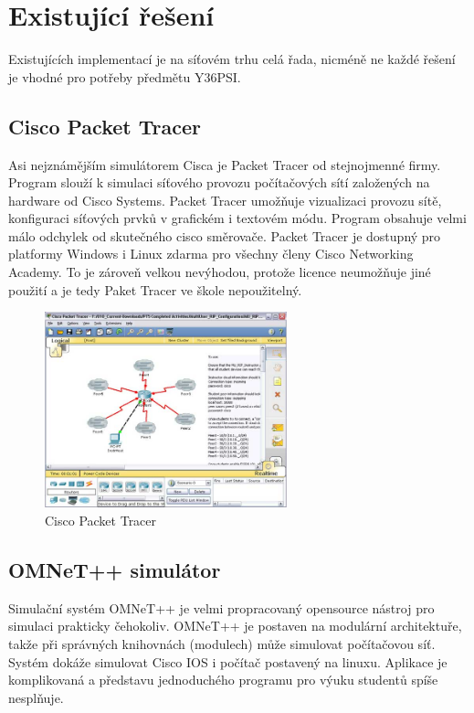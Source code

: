 \chapter{Existující řešení}
Existujících implementací je na síťovém trhu celá řada, nicméně ne každé řešení je vhodné pro potřeby předmětu Y36PSI.

\section{Cisco Packet Tracer}
Asi nejznámějším simulátorem Cisca je Packet Tracer \cite{cisco:pt} od stejnojmenné firmy. Program slouží k simulaci síťového provozu počítačových sítí založených na hardware od Cisco Systems. Packet Tracer umožňuje vizualizaci provozu sítě, konfiguraci síťových prvků v grafickém i textovém módu. Program obsahuje velmi málo odchylek od skutečného cisco směrovače. Packet Tracer je dostupný pro platformy Windows i Linux zdarma pro všechny členy Cisco Networking Academy. To je zároveň velkou nevýhodou, protože licence neumožňuje jiné použití a je tedy Paket Tracer ve škole nepoužitelný.

\begin{figure}[h]
\begin{center}
\includegraphics[width=7cm]{figures/r_cpt}
\caption{Cisco Packet Tracer}
\label{fig:r_cpt}
\end{center}
\end{figure}

\section{OMNeT++ simulátor} 
Simulační systém OMNeT++ \cite{reserse:omnet_hp} je velmi propracovaný opensource nástroj pro simulaci prakticky čehokoliv. OMNeT++ je postaven na modulární architektuře, takže při správných knihovnách (modulech) může simulovat počítačovou síť. Systém dokáže simulovat Cisco IOS i počítač postavený na linuxu. Aplikace je komplikovaná a představu jednoduchého programu pro výuku studentů spíše nesplňuje.

